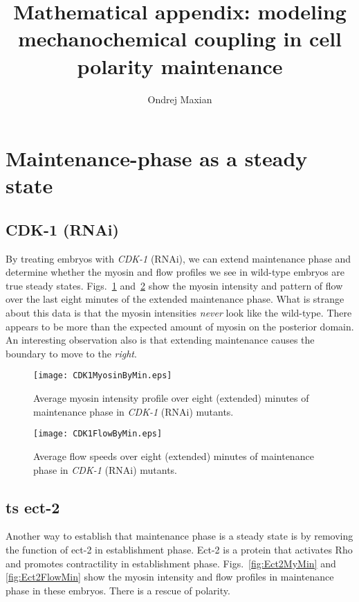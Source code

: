 \documentclass[11pt]{article}
\title{Mathematical appendix: modeling mechanochemical coupling in cell polarity maintenance  \vspace{-0.5 cm}}
\author{Ondrej Maxian  \vspace{-0.75 cm}}
\newcommand{\red}[1]{\color{red}#1\normalcolor}
\newcommand{\6}[1]{#1_{\text{6}}}
\newcommand{\3}[1]{#1_{\text{3}}}
\begin{document}
\maketitle 

\section{Maintenance-phase as a steady state}

\subsection{CDK-1 (RNAi)}
By treating embryos with \emph{CDK-1} (RNAi), we can extend maintenance phase and determine whether the myosin and flow profiles we see in wild-type embryos are true steady states. Figs.\ \ref{fig:CDKMyMin} and\ \ref{fig:CDKFlowMin} show the myosin intensity and pattern of flow over the last eight minutes of the extended maintenance phase. \red{What is strange about this data is that the myosin intensities \emph{never} look like the wild-type. There appears to be more than the expected amount of myosin on the posterior domain. An interesting observation also is that extending maintenance causes the boundary to move to the \emph{right}.}

\begin{figure}
\centering
\texttt{[image: CDK1MyosinByMin.eps]}
\caption{\label{fig:CDKMyMin} Average myosin intensity profile over eight (extended) minutes of maintenance phase in \emph{CDK-1} (RNAi) mutants.}
\end{figure}

\begin{figure}
\centering
\texttt{[image: CDK1FlowByMin.eps]}
\caption{\label{fig:CDKFlowMin} Average flow speeds over eight (extended) minutes of maintenance phase in \emph{CDK-1} (RNAi) mutants. }
\end{figure}


\subsection{ts ect-2}
Another way to establish that maintenance phase is a steady state is by removing the function of ect-2 in establishment phase. Ect-2 is a protein that activates Rho and promotes contractility in establishment phase. Figs.\ \ref{fig:Ect2MyMin} and \ref{fig:Ect2FlowMin} show the myosin intensity and flow profiles in maintenance phase in these embryos. There is a rescue of polarity.
\end{document}

